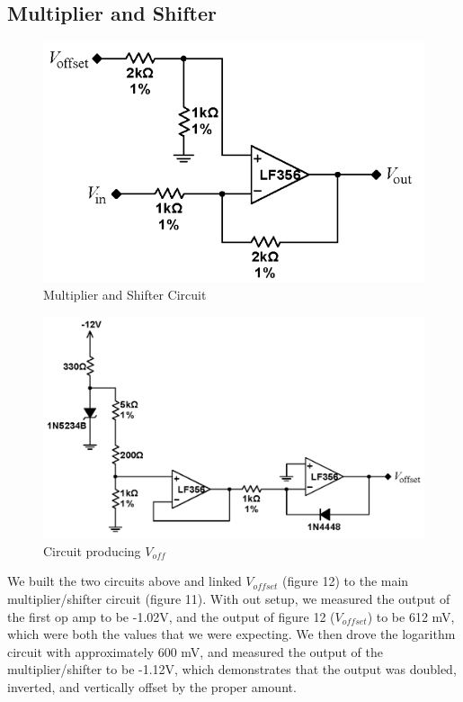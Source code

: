 \documentclass{article}
\begin{document}
    \subsection{Multiplier and Shifter}
    \begin{figure}[H]
        \centering
        \includegraphics[scale = 0.6]{71.png}
        \caption{Multiplier and Shifter Circuit \cite{lab7}}
        \label{fig:my_label}
    \end{figure}
    \begin{figure}[H]
        \centering
        \includegraphics[scale = 0.6]{72.png}
        \caption{Circuit producing $V_{off}$ \cite{lab7}}
        \label{fig:my_label}
    \end{figure}
        We built the two circuits above and linked $V_{offset}$ (figure 12) to the main multiplier/shifter circuit (figure 11). With out setup, we measured the output of the first op amp to be -1.02V, and the output of figure 12 ($V_{offset}$) to be 612 mV, which were both the values that we were expecting. We then drove the logarithm circuit with approximately 600 mV, and measured the output of the multiplier/shifter to be -1.12V, which demonstrates that the output was doubled, inverted, and vertically offset by the proper amount.
\end{document}
